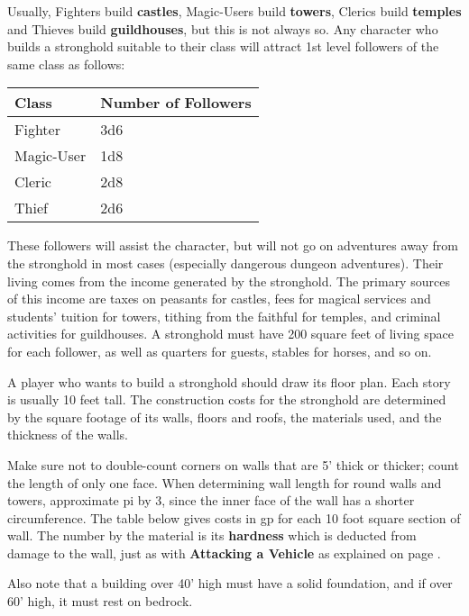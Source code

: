 \documentclass[a4paper,twoside,openany,10pt]{book}
\begin{document}
\begin{multicols}{2}
Usually, Fighters build \textbf{castles}, Magic-Users build \textbf{towers}, Clerics build \textbf{temples} and Thieves build \textbf{guildhouses}, but this is not always so. Any character who builds a stronghold suitable to their class will attract 1st level followers of the same class as follows:\medskip

\begin{tabular*}{0.93\linewidth}{@{\extracolsep{\fill}}ll}
\textbf{Class} & \textbf{Number of Followers} \\\toprule
Fighter & 3d6 \\\hline
Magic-User & 1d8 \\\hline
Cleric & 2d8 \\\hline
Thief & 2d6 \\\bottomrule
\end{tabular*}\medskip

These followers will assist the character, but will not go on adventures away from the stronghold in most cases (especially dangerous dungeon adventures). Their living comes from the income generated by the stronghold. The primary sources of this income are taxes on peasants for castles, fees for magical services and students' tuition for towers, tithing from the faithful for temples, and criminal activities for guildhouses. A stronghold must have 200 square feet of living space for each follower, as well as quarters for guests, stables for horses, and so on.

A player who wants to build a stronghold should draw its floor plan. Each story is usually 10 feet tall. The construction costs for the stronghold are determined by the square footage of its walls, floors and roofs, the materials used, and the thickness of the walls.

Make sure not to double-count corners on walls that are 5' thick or thicker; count the length of only one face. When determining wall length for round walls and towers, approximate pi by 3, since the inner face of the wall has a shorter circumference. The table below gives costs in gp for each 10 foot square section of wall. The number by the material is its \textbf{hardness} which is deducted from damage to the wall, just as with \textbf{Attacking a Vehicle} as explained on page \hyperlink{attacking-a-vehicle}{\pageref{attacking-a-vehicle}}.

Also note that a building over 40' high must have a solid foundation, and if over 60' high, it must rest on bedrock.\medskip


\end{multicols}
\end{document}
